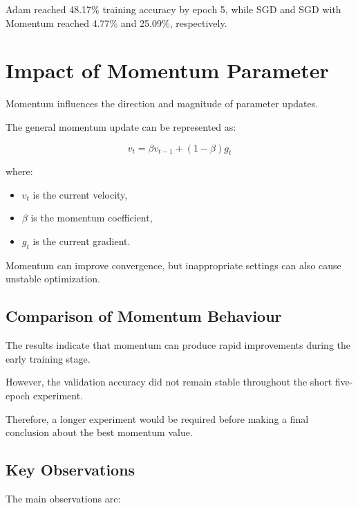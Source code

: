 \documentclass[12pt,a4paper]{report}
\begin{document}
Adam reached 48.17\% training accuracy by epoch 5, while SGD and
SGD with Momentum reached 4.77\% and 25.09\%, respectively.

\section{Impact of Momentum Parameter}

Momentum influences the direction and magnitude of parameter
updates.

The general momentum update can be represented as:

\[
v_t=\beta v_{t-1}+(1-\beta)g_t
\]

where:

\begin{itemize}
    \item $v_t$ is the current velocity,
    \item $\beta$ is the momentum coefficient,
    \item $g_t$ is the current gradient.
\end{itemize}

Momentum can improve convergence, but inappropriate settings can
also cause unstable optimization.

\subsection{Comparison of Momentum Behaviour}

The results indicate that momentum can produce rapid improvements
during the early training stage.

However, the validation accuracy did not remain stable throughout
the short five-epoch experiment.

Therefore, a longer experiment would be required before making a
final conclusion about the best momentum value.

\subsection{Key Observations}

The main observations are:
\end{document}
